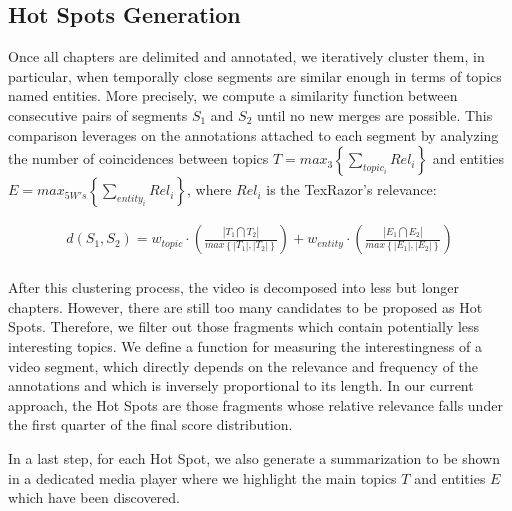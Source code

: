 \documentclass{llncs}
\begin{document}
\subsection{Hot Spots Generation}
\label{sec:hotspots-generation}
Once all chapters are delimited and annotated, we iteratively cluster them, in particular, when temporally close segments are similar enough in terms of topics named entities. More precisely, we compute a similarity function between consecutive pairs of segments $S_1$ and $S_2$ until no new merges are possible. This comparison leverages on the annotations attached to each segment by analyzing the number of coincidences between topics $T = max_{3}\left \{ \sum_{topic_{i}} Rel_{i} \right \}$ and entities $E = max_{5W's}\left \{ \sum_{entity_{i}} Rel_{i} \right  \}$, where $Rel_{i}$ is the TexRazor's relevance:

\begin{equation}
\begin{split}
d\left ( S_{1} , S_{2} \right ) = w_{topic}\cdot \left ( \frac{\left | T_{1} \bigcap T_{2} \right |}{max \left \{ \left | T_{1} \right |, \left | T_{2} \right |\right \}} \right ) + w_{entity}\cdot \left ( \frac{\left | E_{1} \bigcap E_{2} \right |}{max \left \{ \left | E_{1} \right |, \left | E_{2} \right |\right \}} \right ) \\
\end{split}
\end{equation}

After this clustering process, the video is decomposed into less but longer chapters. However, there are still too many candidates to be proposed as Hot Spots. Therefore, we filter out those fragments which contain potentially less interesting topics. We define a function for measuring the interestingness of a video segment, which directly depends on the relevance and frequency of the annotations and which is inversely proportional to its length. In our current approach, the Hot Spots are those fragments whose relative relevance falls under the first quarter of the final score distribution.


In a last step, for each Hot Spot, we also generate a summarization to be shown in a dedicated media player where we highlight the main topics $T$ and entities $E$ which have been discovered.
\end{document}
